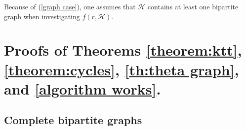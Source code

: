 \documentclass[12pt]{article}%
\begin{document}
Because of (\ref{graph case}), one assumes that $\mathcal{H}$ contains at least one bipartite graph when investigating $f(r , \mathcal{H})$.  
  

\section{Proofs of Theorems \ref{theorem:ktt}, \ref{theorem:cycles}, \ref{th:theta graph}, and \ref{algorithm works}.}\label{cycles}

 
\subsection{Complete bipartite graphs}
\end{document}

